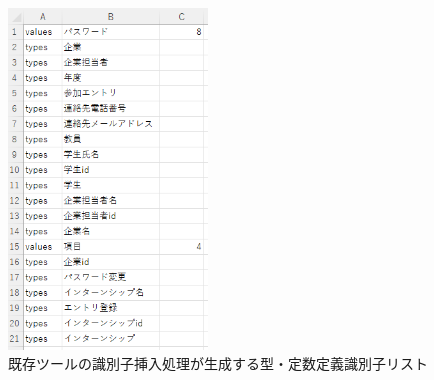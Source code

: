 \begin{figure}[tp]
    \begin{center}
        \includegraphics[width=200]{image/exis_katateisu_id_list.PNG}
        \caption{既存ツールの識別子挿入処理が生成する型・定数定義識別子リスト}
        \label{fig:exis_katateisu_id_list}
    \end{center}
\end{figure}


